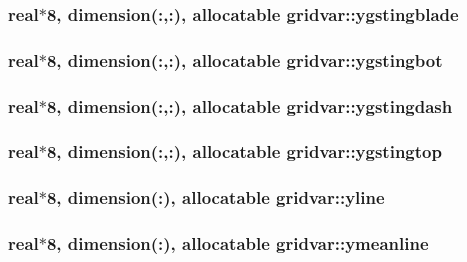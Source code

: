 \subsubsection[{ygstingblade}]{\setlength{\rightskip}{0pt plus 5cm}real$\ast$8, dimension(\+:,\+:), allocatable gridvar\+::ygstingblade}\label{namespacegridvar_a11c63db6c8ecfb576129fdd9eedeb158}
\hypertarget{namespacegridvar_a819dd42b0469aff2373b237be7d72b84}{}
\subsubsection[{ygstingbot}]{\setlength{\rightskip}{0pt plus 5cm}real$\ast$8, dimension(\+:,\+:), allocatable gridvar\+::ygstingbot}\label{namespacegridvar_a819dd42b0469aff2373b237be7d72b84}
\hypertarget{namespacegridvar_a000b3ae1934c0e65a9b3c6d914ba6339}{}
\subsubsection[{ygstingdash}]{\setlength{\rightskip}{0pt plus 5cm}real$\ast$8, dimension(\+:,\+:), allocatable gridvar\+::ygstingdash}\label{namespacegridvar_a000b3ae1934c0e65a9b3c6d914ba6339}
\hypertarget{namespacegridvar_a7ca6b72f5d1eb6a91685b56d93b936c6}{}
\subsubsection[{ygstingtop}]{\setlength{\rightskip}{0pt plus 5cm}real$\ast$8, dimension(\+:,\+:), allocatable gridvar\+::ygstingtop}\label{namespacegridvar_a7ca6b72f5d1eb6a91685b56d93b936c6}
\hypertarget{namespacegridvar_a50e8fc927e6dd816267bc2eb8e20283f}{}
\subsubsection[{yline}]{\setlength{\rightskip}{0pt plus 5cm}real$\ast$8, dimension(\+:), allocatable gridvar\+::yline}\label{namespacegridvar_a50e8fc927e6dd816267bc2eb8e20283f}
\hypertarget{namespacegridvar_a7fb5eedd8e1bc9b66181f2cc2e461c0c}{}
\subsubsection[{ymeanline}]{\setlength{\rightskip}{0pt plus 5cm}real$\ast$8, dimension(\+:), allocatable gridvar\+::ymeanline}\label{namespacegridvar_a7fb5eedd8e1bc9b66181f2cc2e461c0c}
\hypertarget{namespacegridvar_aae5cbf9885ae6ff5abebd0b9768a574d}{}
